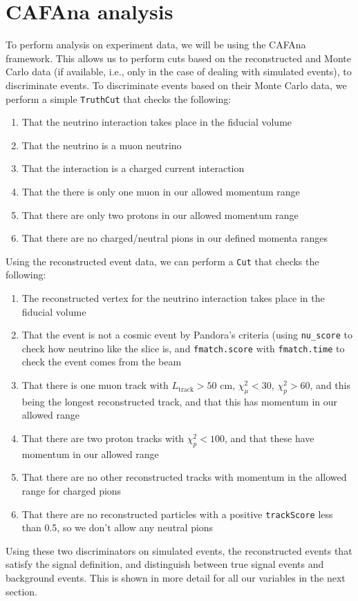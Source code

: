 \documentclass{article}
\begin{document}
\section{CAFAna analysis}

To perform analysis on experiment data, we will be using the CAFAna framework. This allows us to perform cuts based on the reconstructed and Monte Carlo data (if available, i.e., only in the case of dealing with simulated events), to discriminate events. To discriminate events based on their Monte Carlo data, we perform a simple \verb|TruthCut| that checks the following:
\begin{enumerate}[label=(\roman*)]
    \item That the neutrino interaction takes place in the fiducial volume
    \item That the neutrino is a muon neutrino
    \item That the interaction is a charged current interaction
    \item That the there is only one muon in our allowed momentum range
    \item That there are only two protons in our allowed momentum range
    \item That there are no charged/neutral pions in our defined momenta ranges
\end{enumerate}
Using the reconstructed event data, we can perform a \verb|Cut| that checks the following:
\begin{enumerate}[label=(\roman*)]
    \item The reconstructed vertex for the neutrino interaction takes place in the fiducial volume
    \item That the event is not a cosmic event by Pandora's criteria (using \verb|nu_score| to check how neutrino like the slice is, and \verb|fmatch.score| with \verb|fmatch.time| to check the event comes from the beam
    \item That there is one muon track with $L_{\text{track}} > 50$ cm, $\chi^2_\mu < 30$, $\chi^2_p > 60$, and this being the longest reconstructed track, and that this has momentum in our allowed range
    \item That there are two proton tracks with $\chi^2_p < 100$, and that these have momentum in our allowed range
    \item That there are no other reconstructed tracks with momentum in the allowed range for charged pions
    \item That there are no reconstructed particles with a positive \verb|trackScore| less than 0.5, so we don't allow any neutral pions
\end{enumerate}
Using these two discriminators on simulated events, the reconstructed events that satisfy the signal definition, and distinguish between true signal events and background events. This is shown in more detail for all our variables in the next section.
\end{document}
